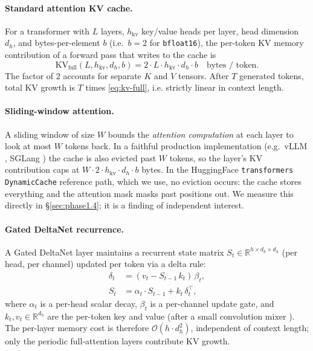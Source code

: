 \documentclass[11pt,letterpaper]{article}
\newcommand{\bigO}{\mathcal{O}}
\begin{document}
\paragraph{Standard attention KV cache.}
For a transformer with $L$ layers, $h_\mathrm{kv}$ key/value heads per
layer, head dimension $d_h$, and bytes-per-element $b$ (i.e.~$b=2$ for
\texttt{bfloat16}), the per-token KV memory contribution of a forward
pass that writes to the cache is
\begin{equation}
\mathrm{KV}_\mathrm{full}(L, h_\mathrm{kv}, d_h, b) =
2 \cdot L \cdot h_\mathrm{kv} \cdot d_h \cdot b
\quad \text{bytes / token}.
\label{eq:kv-full}
\end{equation}
The factor of $2$ accounts for separate $K$ and $V$ tensors. After $T$
generated tokens, total KV growth is $T$ times \eqref{eq:kv-full}, i.e.
strictly linear in context length.

\paragraph{Sliding-window attention.}
A sliding window of size $W$ bounds the \emph{attention computation} at
each layer to look at most $W$ tokens back. In a faithful
production implementation (e.g.~vLLM \citep{TODO:vllm},
SGLang \citep{TODO:sglang}) the cache is also evicted past $W$ tokens, so
the layer's KV contribution caps at $W \cdot 2 \cdot h_\mathrm{kv} \cdot
d_h \cdot b$ bytes. In the
HuggingFace \texttt{transformers} \texttt{DynamicCache} reference path,
which we use, no eviction occurs: the cache stores everything and the
attention mask masks past positions out. We measure this directly in
\S\ref{sec:phase1.4}; it is a finding of independent interest.

\paragraph{Gated DeltaNet recurrence.}
A Gated DeltaNet layer \citep{TODO:gated-deltanet, TODO:raschka-deltanet}
maintains a recurrent state matrix
$S_t \in \mathbb{R}^{h \times d_h \times d_h}$ (per head, per channel)
updated per token via a delta rule:
\begin{align}
\delta_t &= (v_t - S_{t-1}\,k_t)\,\beta_t, \\
S_t &= \alpha_t \cdot S_{t-1} + k_t \,\delta_t^\top,
\end{align}
where $\alpha_t$ is a per-head scalar decay, $\beta_t$ is a per-channel
update gate, and $k_t, v_t \in \mathbb{R}^{d_h}$ are the per-token key
and value (after a small convolution mixer \citep{TODO:gated-deltanet}).
The per-layer memory cost is therefore $\bigO(h \cdot d_h^2)$,
independent of context length; only the periodic full-attention layers
contribute KV growth.
\end{document}
